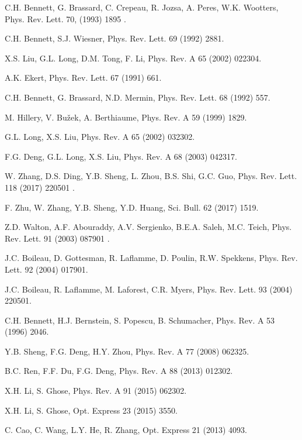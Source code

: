 \documentclass[preprintnumbers,showkeys,amsmath,amssymb]{revtex4}%
\begin{document}
\begin{thebibliography}{1}

 C.H. Bennett, G. Brassard, C. Crepeau, R. Jozsa, A. Peres, W.K. Wootters, Phys. Rev. Lett. 70,   (1993) 1895 .

 C.H. Bennett, S.J. Wiesner, Phys. Rev. Lett. 69 (1992) 2881.

 X.S. Liu, G.L. Long, D.M. Tong, F. Li, Phys. Rev. A 65 (2002) 022304.

 A.K. Ekert, Phys. Rev. Lett. 67 (1991) 661.

 C.H. Bennett, G. Brassard, N.D. Mermin, Phys. Rev. Lett. 68 (1992) 557.

 M. Hillery, V. Bu\v{z}ek, A. Berthiaume, Phys. Rev. A 59 (1999) 1829.

 G.L. Long, X.S. Liu, Phys. Rev. A 65 (2002) 032302.

 F.G. Deng, G.L. Long, X.S. Liu, Phys. Rev. A 68 (2003) 042317.

 W. Zhang, D.S. Ding, Y.B. Sheng, L. Zhou, B.S. Shi, G.C. Guo, Phys. Rev. Lett. 118 (2017) 220501 .

F. Zhu, W. Zhang, Y.B. Sheng, Y.D. Huang, Sci. Bull.   62 (2017)
1519.


  Z.D. Walton, A.F. Abouraddy, A.V. Sergienko, B.E.A. Saleh, M.C. Teich, Phys. Rev. Lett. 91 (2003) 087901 .

 J.C. Boileau, D. Gottesman, R. Laflamme, D. Poulin, R.W. Spekkens, Phys. Rev. Lett. 92 (2004) 017901.

 J.C. Boileau, R. Laflamme, M. Laforest, C.R. Myers, Phys. Rev. Lett. 93 (2004) 220501.



 C.H. Bennett, H.J. Bernstein, S. Popescu, B. Schumacher, Phys. Rev. A 53 (1996) 2046.

 Y.B. Sheng, F.G. Deng, H.Y. Zhou, Phys. Rev. A 77 (2008) 062325.

 B.C. Ren, F.F. Du, F.G. Deng, Phys. Rev. A 88 (2013) 012302.

 X.H. Li, S. Ghose, Phys. Rev. A 91 (2015) 062302.

 X.H. Li, S. Ghose, Opt. Express 23 (2015) 3550.

 C. Cao, C. Wang, L.Y. He, R. Zhang, Opt. Express 21 (2013) 4093.


\end{thebibliography}
\end{document}
